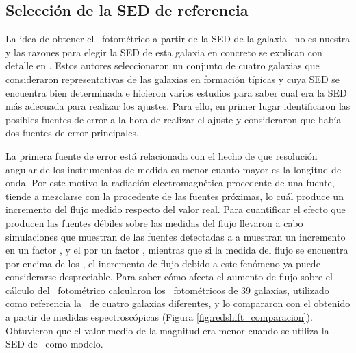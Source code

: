\subsection{Selección de la SED de referencia}\label{sec:selecion_sed} 

La idea de obtener el \rt\ fotométrico a partir de la SED de la galaxia \smm\ no es nuestra y las razones para elegir la SED de esta galaxia en concreto se explican con detalle en \cite{article:Lapi_2011}. Estos autores seleccionaron un conjunto de cuatro galaxias que consideraron representativas de las galaxias en formación típicas y cuya SED se encuentra bien determinada e hicieron varios estudios para saber cual era la SED más adecuada para realizar los ajustes. Para ello, en primer lugar identificaron las posibles fuentes de error a la hora de realizar el ajuste y consideraron que había dos fuentes de error principales.

La primera fuente de error está relacionada con el hecho de que resolución angular de los instrumentos de medida es menor cuanto mayor es la longitud de onda. Por este motivo la radiación electromagnética procedente de una fuente, tiende a mezclarse con la procedente de las fuentes próximas, lo cuál produce un incremento del flujo medido respecto del valor real. Para cuantificar el efecto que producen las fuentes débiles sobre las medidas del flujo llevaron a cabo simulaciones \cite{article:Rigby_2011} que muestran  de las fuentes detectadas a  a  muestran un incremento en un factor , y el  por un factor , mientras que si la medida del flujo se encuentra por encima de los , el incremento de flujo debido a este fenómeno ya puede considerarse despreciable. Para saber cómo afecta el aumento de flujo sobre el cálculo del \rt\ fotométrico calcularon los \rts\ fotométricos de 39 galaxias, utilizado como referencia la \sed\ de cuatro galaxias diferentes, y lo compararon con el obtenido a partir de medidas espectroscópicas (Figura \ref{fig:redshift_comparacion}). Obtuvieron que el valor medio de la magnitud  era menor cuando se utiliza la SED de \smm\ como modelo. 

